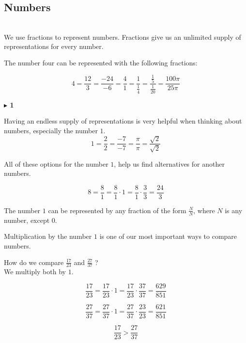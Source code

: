 \documentclass{ximera}
\begin{document}
\subsection*{Numbers} \\



We use fractions to represent numbers.  Fractions give us an unlimited supply of representations for every number.

The number four can be represented with the following fractions:

\[
4 = \frac{12}{3} = \frac{-24}{-6} = \frac{4}{1} = \frac{1}{\tfrac{1}{4}} = \frac{\tfrac{1}{5}}{\tfrac{1}{20}} = \frac{100\pi}{25\pi}
\]








\textbf{\textcolor{purple!85!blue}{$\blacktriangleright$ 1}} 



Having an endless supply of representations is very helpful when thinking about numbers, especially the number $1$. \\


\[
1 = \frac{2}{2} = \frac{-7}{-7} = \frac{\pi}{\pi} = \frac{\sqrt{2}}{\sqrt{2}} 
\]


All of these options for the number $1$, help us find alternatives for another numbers.


\[
8 = \frac{8}{1} = \frac{8}{1} \cdot 1 = \frac{8}{1} \cdot \frac{3}{3} = \frac{24}{3}
\]




\begin{idea}

The number $1$ can be represented by any fraction of the form $\frac{N}{N}$, where $N$ is any number, except $0$.


\end{idea}







Multiplication by the number $1$ is one of our most important ways to compare numbers.




\begin{example}

How do we compare $\frac{17}{23}$ and $\frac{27}{37}$ ? \\

We multiply both by $1$.


\[
\frac{17}{23} = \frac{17}{23} \cdot 1 = \frac{17}{23} \cdot \frac{37}{37} = \frac{629}{851}
\]


\[
\frac{27}{37} = \frac{27}{37} \cdot 1 = \frac{27}{37} \cdot \frac{23}{23} = \frac{621}{851}
\]



\[
\frac{17}{23} > \frac{27}{37}
\]


\end{example}
\end{document}
